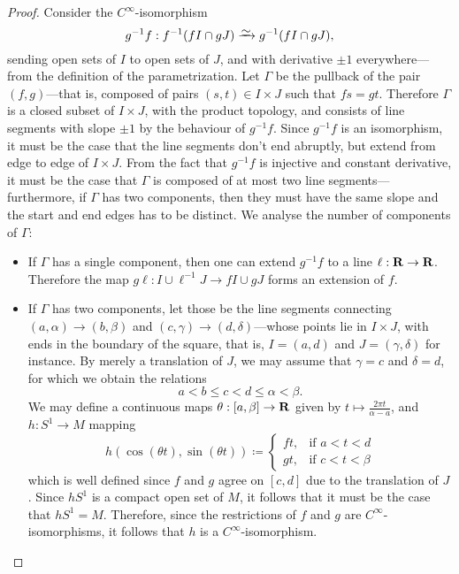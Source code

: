 \begin{proof}
    Consider the \(C^{\infty}\)-isomorphism
    \[
        g^{-1} f: f^{-1}(f I \cap g J) \isoto g^{-1}(f I \cap g J),
    \]
    sending open sets of \(I\) to open sets of \(J\), and with derivative \(\pm 1\)
    everywhere---from the definition of the parametrization. Let \(\Gamma\) be the
    pullback of the pair \((f, g)\)---that is, composed of pairs
    \((s, t) \in I \times J\) such that \(f s = g t\). Therefore \(\Gamma\) is a
    closed subset of \(I \times J\), with the product topology, and consists of line
    segments with slope \(\pm 1\) by the behaviour of \(g^{-1} f\). Since
    \(g^{-1} f\) is an isomorphism, it must be the case that the line segments don't
    end abruptly, but extend from edge to edge of \(I \times J\). From the fact that
    \(g^{-1} f\) is injective and constant derivative, it must be the case that
    \(\Gamma\) is composed of at most two line segments---furthermore, if \(\Gamma\)
    has two components, then they must have the same slope and the start and end
    edges has to be distinct. We analyse the number of components of \(\Gamma\):
    \begin{itemize}\setlength\itemsep{0em}
        \item If \(\Gamma\) has a single component, then one can extend \(g^{-1} f\) to
              a line \(\ell: \mathbf{R} \to \mathbf{R}\). Therefore the map
              \(g \ell: I \cup \ell^{-1} J \to f I \cup g J\) forms an extension of \(f\).

        \item If \(\Gamma\) has two components, let those be the line segments
              connecting \((a, \alpha) \to (b, \beta)\) and
              \((c, \gamma) \to (d, \delta)\)---whose points lie in \(I \times J\), with
              ends in the boundary of the square, that is, \(I = (a, d)\) and
              \(J = (\gamma, \delta)\) for instance. By merely a translation of \(J\), we
              may assume that \(\gamma = c\) and \(\delta = d\), for which we obtain the
              relations
              \[
                  a < b \leq c < d \leq \alpha < \beta.
              \]
              We may define a continuous maps \(\theta: [a, \beta] \to \mathbf{R}\) given by
              \(t \mapsto \frac{2 \pi t}{\alpha - a}\), and \(h: S^1 \to M\) mapping
              \[
                  h(\cos(\theta t), \sin(\theta t)) \coloneq
                  \begin{cases}
                      f t, & \text{if } a < t < d     \\
                      g t, & \text{if } c < t < \beta
                  \end{cases}
              \]
              which is well defined since \(f\) and \(g\) agree on \([c, d]\) due to the
              translation of \(J\). Since \(h S^1\) is a compact open set of \(M\), it
              follows that it must be the case that \(h S^1 = M\). Therefore, since the
              restrictions of \(f\) and \(g\) are \(C^{\infty}\)-isomorphisms, it follows
              that \(h\) is a \(C^{\infty}\)-isomorphism.
    \end{itemize}
\end{proof}

